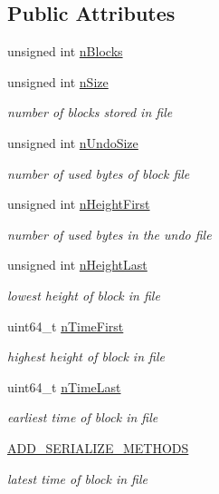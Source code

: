 \subsection*{Public Attributes}
\begin{DoxyCompactItemize}
\item 
unsigned int \mbox{\hyperlink{class_c_block_file_info_adf2de4bb4d8a0a8f2116ed90f0770d03}{n\+Blocks}}
\item 
unsigned int \mbox{\hyperlink{class_c_block_file_info_afb13102ba49548c24812a4236851c3a9}{n\+Size}}
\begin{DoxyCompactList}\small\item\em number of blocks stored in file \end{DoxyCompactList}\item 
unsigned int \mbox{\hyperlink{class_c_block_file_info_ad3e555fd733ef8f38430554c2db5e9d1}{n\+Undo\+Size}}
\begin{DoxyCompactList}\small\item\em number of used bytes of block file \end{DoxyCompactList}\item 
unsigned int \mbox{\hyperlink{class_c_block_file_info_a66d258b11b1aec30cbacdc6130c271a8}{n\+Height\+First}}
\begin{DoxyCompactList}\small\item\em number of used bytes in the undo file \end{DoxyCompactList}\item 
unsigned int \mbox{\hyperlink{class_c_block_file_info_aabbcf808931e7eaf2278b3d7172fad3a}{n\+Height\+Last}}
\begin{DoxyCompactList}\small\item\em lowest height of block in file \end{DoxyCompactList}\item 
uint64\+\_\+t \mbox{\hyperlink{class_c_block_file_info_a0e928257d1f003ede485ce49e8cf9189}{n\+Time\+First}}
\begin{DoxyCompactList}\small\item\em highest height of block in file \end{DoxyCompactList}\item 
uint64\+\_\+t \mbox{\hyperlink{class_c_block_file_info_a1d12e4202474bb2f299d18d7d1f28c78}{n\+Time\+Last}}
\begin{DoxyCompactList}\small\item\em earliest time of block in file \end{DoxyCompactList}\item 
\mbox{\hyperlink{class_c_block_file_info_ab4daf4df00f90dee15e3a7d2cdb7a273}{A\+D\+D\+\_\+\+S\+E\+R\+I\+A\+L\+I\+Z\+E\+\_\+\+M\+E\+T\+H\+O\+DS}}
\begin{DoxyCompactList}\small\item\em latest time of block in file \end{DoxyCompactList}\end{DoxyCompactItemize}


